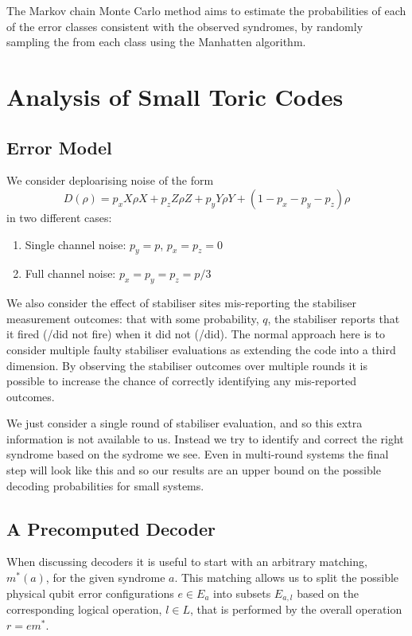 The Markov chain Monte Carlo method aims to estimate the probabilities of each of the error classes consistent with the observed syndromes, by randomly sampling the from each class using the Manhatten algorithm. 



\section{Analysis of Small Toric Codes}


\subsection{Error Model}

We consider deploarising noise of the form
\begin{equation} \label{noise_eq}
  D(\rho) = p_x X\rho X +  p_z Z\rho Z + p_y Y\rho Y  + (1- p_x - p_y - p_z)\rho
\end{equation}
in two different cases:
\begin{enumerate}
  \item Single channel noise: $p_y = p$, $p_x = p_z = 0$
  \item Full channel noise: $p_x = p_y = p_z = p/3$
\end{enumerate}

We also consider the effect of stabiliser sites mis-reporting the stabiliser measurement outcomes: that with some probability, $q$, the stabiliser reports that it fired (/did not fire) when it did not (/did). The normal approach here is to consider multiple faulty stabiliser evaluations as extending the code into a third dimension. By observing the stabiliser outcomes over multiple rounds it is possible to increase the chance of correctly identifying any mis-reported outcomes.

We just consider a single round of stabiliser evaluation, and so this extra information is not available to us. Instead we try to identify and correct the right syndrome based on the sydrome we see. Even in multi-round systems the final step will look like this and so our results are an upper bound on the possible decoding probabilities for small systems.

\subsection{A Precomputed Decoder}

When discussing decoders it is useful to start with an arbitrary matching, $m^*(a)$, for the given syndrome $a$. This matching allows us to split the possible physical qubit error configurations $e \in E_a$ into subsets $E_{a,l}$ based on the corresponding logical operation, $l\in L$, that is performed by the overall operation $r = em^*$.

